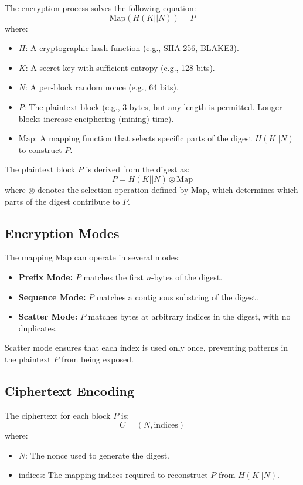 \documentclass[11pt,a4paper]{article}
\begin{document}
The encryption process solves the following equation:
\[
\text{Map}(H(K || N)) = P
\]
where:
\begin{itemize}
  \item \( H \): A cryptographic hash function (e.g., SHA-256, BLAKE3).
  \item \( K \): A secret key with sufficient entropy (e.g., 128 bits).
  \item \( N \): A per-block random nonce (e.g., 64 bits).
  \item \( P \): The plaintext block (e.g., 3 bytes, but any length is permitted. Longer blocks increase enciphering (mining) time).
  \item \( \text{Map} \): A mapping function that selects specific parts of the digest \( H(K || N) \) to construct \( P \).
\end{itemize}

The plaintext block \( P \) is derived from the digest as:
\[
P = H(K || N) \otimes \text{Map}
\]
where \( \otimes \) denotes the selection operation defined by \( \text{Map} \), which determines which parts of the digest contribute to \( P \).

\subsection*{Encryption Modes}

The mapping \( \text{Map} \) can operate in several modes:
\begin{itemize}
  \item \textbf{Prefix Mode:} \( P \) matches the first \( n \)-bytes of the digest.
  \item \textbf{Sequence Mode:} \( P \) matches a contiguous substring of the digest.
  \item \textbf{Scatter Mode:} \( P \) matches bytes at arbitrary indices in the digest, with no duplicates.
\end{itemize}

Scatter mode ensures that each index is used only once, preventing patterns in the plaintext \( P \) from being exposed.

\subsection*{Ciphertext Encoding}

The ciphertext for each block \( P \) is:
\[
C = (N, \text{indices})
\]
where:
\begin{itemize}
  \item \( N \): The nonce used to generate the digest.
  \item \( \text{indices} \): The mapping indices required to reconstruct \( P \) from \( H(K || N) \).
\end{itemize}
\end{document}
